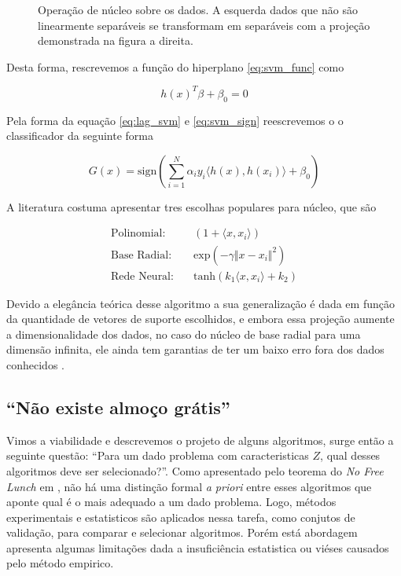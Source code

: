 \begin{figure}[ht]
   \centering
    \def\svgwidth{\linewidth}
    \caption{Operação de núcleo sobre os dados. A esquerda dados que não são
    linearmente separáveis se transformam em separáveis com a projeção
    demonstrada na figura a direita.}
    \label{fig:svm_kernel}
\end{figure}

Desta forma, rescrevemos a função do hiperplano \ref{eq:svm_func} como

 \begin{equation}
    \label{eq:svm_kernel}
    h(x)^T\beta + \beta_0 = 0
\end{equation}

Pela forma da equação \ref{eq:lag_svm} e \ref{eq:svm_sign} reescrevemos o
o classificador da seguinte forma

\begin{equation}
    G(x) = \text{sign}
    \left(\sum_{i=1}^N \alpha_i y_i \langle h(x),h(x_i)\rangle+\beta_0 \right)
\end{equation}

A literatura costuma apresentar tres escolhas populares para núcleo, que são

\begin{equation}
    \begin{split}
        \text{Polinomial:} &\quad (1+\langle x,x_i\rangle)\\
        \text{Base Radial:} &\quad \text{exp}(-\gamma \Vert x - x_i\Vert^2)\\
        \text{Rede Neural:} &\quad \text{tanh}(k_1\langle x,x_i\rangle+k_2)
    \end{split}
\end{equation}

Devido a elegância teórica desse algoritmo a sua generalização é dada em função
da quantidade de vetores de suporte escolhidos, e embora essa projeção aumente
a dimensionalidade dos dados, no caso do núcleo de base radial para uma
dimensão infinita, ele ainda tem garantias de ter um baixo erro fora dos dados
conhecidos \cite{vapnik2013nature}.

\subsection{``Não existe almoço grátis''}
Vimos a viabilidade e descrevemos o projeto de alguns algoritmos, surge então a
seguinte questão: ``Para um dado problema com caracteristicas $Z$, qual desses
algoritmos deve ser selecionado?''. Como apresentado pelo teorema do \textit{No
Free Lunch} em \cite{wolpert1997no,wolpert1996lack}, não há uma distinção
formal \textit{a priori} entre esses algoritmos que aponte qual é o mais
adequado a um dado problema. Logo, métodos experimentais e estatisticos são
aplicados nessa tarefa, como conjutos de validação, para comparar e selecionar
algoritmos. Porém está abordagem apresenta algumas limitações dada a
insuficiência estatistica ou viéses causados pelo método empirico.


